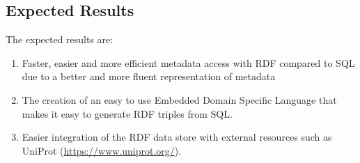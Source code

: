 \subsection{Expected Results}
The expected results are:

\begin{enumerate}

\item Faster, easier and more efficient metadata access with RDF compared to SQL due to a better and more fluent representation of metadata

\item The creation of an easy to use Embedded Domain Specific Language that makes it easy to generate RDF triples from SQL.

\item Easier integration of the RDF data store with external resources such as UniProt (\url{https://www.uniprot.org/}).
\end{enumerate}
